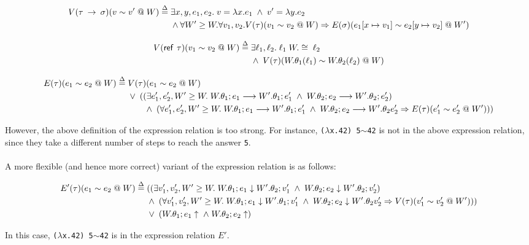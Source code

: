 \documentclass{notes}
\begin{document}
\begin{equation}
  \begin{aligned}
    V(\tau \: \rightarrow \: \sigma)(v \sim v' \; @ \; W) \overset{\Delta}{=} \; & \exists x, y, e_1, e_2 . \; v = \lambda x . e_1 \; \land \; v' = \lambda y . e_2 \\
    & \land \forall W' \geq W. \forall v_1, v_2. V(\tau)(v_1 \sim v_2 \; @ \; W) \Rightarrow E(\sigma)(e_1[x \mapsto v_1] \sim e_2[y \mapsto v_2] \; @ \; W')
  \end{aligned}
\end{equation}

\begin{equation}
  \begin{aligned}
    V(\textsf{ref} \:\: \tau)(v_1 \sim v_2 \; @ \; W) \overset{\Delta}{=} \; & \exists \ell_1, \ell_2 . \; \ell_1 \; W.\cong \; \ell_2 \\
    & \land \; V(\tau)(W.\theta_1(\ell_1) \sim W.\theta_2(\ell_2) \; @ \; W)
  \end{aligned}
\end{equation}

\begin{equation}
  \begin{aligned}
    E(\tau)(e_1 \sim e_2 \; @ \; W) \overset{\Delta}{=} \; & V(\tau)(e_1 \sim e_2 \; @ \; W) \\
    & \lor \; (
      (\exists e_1', e_2', W' \geq W . \; W.\theta_1; e_1 \longrightarrow W'.\theta_1; e_1' \; \land \; W.\theta_2; e_2 \longrightarrow W'.\theta_2; e'_2) \\
      & \; \; \; \; \; \; \; \land \; (\forall e'_1, e'_2, W' \geq W . \; W.\theta_1; e_1 \longrightarrow W'.\theta_1; e'_1 \; \land \; W.\theta_2; e_2 \longrightarrow W'.\theta_2 e'_2 \Rightarrow E(\tau)(e'_1 \sim e'_2 \; @ \; W'))
    )
  \end{aligned}
\end{equation}

\vspace{0.1in}

However, the above definition of the expression relation is too strong.
For instance, \verb|(|$\lambda$\verb|x.42) 5|\;$\sim$\;\verb|42| is not in the above expression relation, since they take a different number of steps to reach the answer \verb|5|. \\ \\
A more flexible (and hence more correct) variant of the expression relation is as follows:

\begin{equation}
  \begin{aligned}
    E'(\tau)(e_1 \sim e_2 \; @ \; W) \overset{\Delta}{=} \; & (
      (\exists v_1', v_2', W' \geq W . \; W.\theta_1; e_1 \downarrow W'.\theta_2; v_1' \; \land \; W.\theta_2; e_2 \downarrow W'.\theta_2; v'_2) \\
      & \land \; (\forall v'_1, v'_2, W' \geq W . \; W.\theta_1; e_1 \downarrow W'.\theta_1; v'_1 \; \land \; W.\theta_2; e_2 \downarrow W'.\theta_2 v'_2 \Rightarrow V(\tau)(v'_1 \sim v'_2 \; @ \; W'))
    ) \\
    & \lor \; (W.\theta_1; e_1 \uparrow \; \land \; W.\theta_2; e_2 \uparrow)
  \end{aligned}
\end{equation}

In this case, \verb|(|$\lambda$\verb|x.42) 5|\;$\sim$\;\verb|42| is in the expression relation $E'$.
\end{document}
